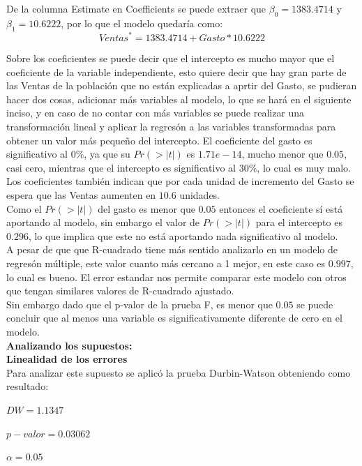 \documentclass[12pt,a4paper]{article}
\begin{document}
	De la columna Estimate en Coefficients se puede extraer que $\beta_0=1383.4714$ y $\beta_1=10.6222$, por lo que el modelo quedaría como:
	\begin{equation*}
	{Ventas}^{*} = 1383.4714 + Gasto * 10.6222
	\end{equation*}
	
	Sobre los coeficientes se puede decir que el intercepto es mucho mayor que el coeficiente de la variable independiente, esto quiere decir que hay gran parte de las Ventas de la población que no están explicadas a aprtir del Gasto, se pudieran hacer dos cosas, adicionar más variables al modelo, lo que se hará en el siguiente inciso, y en caso de no contar con más variables se puede realizar una transformación lineal y aplicar la regresón a las variables transformadas para obtener un valor más pequeño del intercepto. 
	El coeficiente del gasto es significativo al $0\%$, ya que su $Pr(>|t|)$ es $1.71e-14$, mucho menor que $0.05$, casi cero, mientras que el intercepto es significativo al $30\%$, lo cual es muy malo. Los coeficientes también indican que por cada unidad de incremento del Gasto se espera que las Ventas aumenten en $10.6$ unidades.\\
	
	Como el $Pr(>|t|)$ del gasto es menor que $0.05$ entonces el coeficiente sí está aportando al modelo, sin embargo el valor de $Pr(>|t|)$ para el intercepto es $0.296$, lo que implica que este no está aportando nada significativo al modelo.\\
	
	A pesar de que que R-cuadrado tiene más sentido analizarlo en un modelo de regresón múltiple, este valor cuanto más cercano a 1 mejor, en este caso es $0.997$, lo cual es bueno. El error estandar nos permite comparar este modelo con otros que tengan similares valores de R-cuadrado ajustado.\\ 
	
	Sin embargo dado que el p-valor de la prueba F, es menor que $0.05$ se puede concluir que al menos una variable es significativamente diferente de cero en el modelo.\\
	
	\textbf{Analizando los supuestos:}\\
	
	\textbf{Linealidad de los errores}\\
	Para analizar este supuesto se aplicó la prueba  Durbin-Watson obteniendo como resultado:
	 
	\begin{center}
		$DW = 1.1347$
		
		$p-valor = 0.03062$
		
		$\alpha = 0.05$
	\end{center}
	
\end{document}
